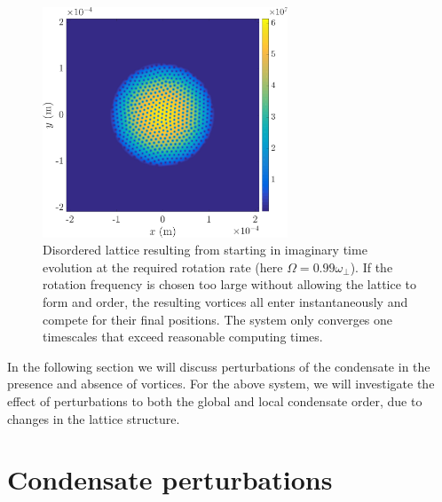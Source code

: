 \begin{figure}
    \centering
    \includegraphics[width=0.65\textwidth]{Images/ch4_vtx/toofast_099_1e7}
    \caption{Disordered lattice resulting from starting in imaginary time evolution at the required rotation rate (here $\Omega=0.99\omega_\perp$). If the rotation frequency is chosen too large without allowing the lattice to form and order, the resulting vortices all enter instantaneously and compete for their final positions. The system only converges one timescales that exceed reasonable computing times.}
    \label{fig:malformed_lattice}
\end{figure}

In the following section we will discuss perturbations of the condensate in the presence and absence of vortices. For the above system, we will investigate the effect of perturbations to both the global and local condensate order, due to changes in the lattice structure.

\section{Condensate perturbations}
